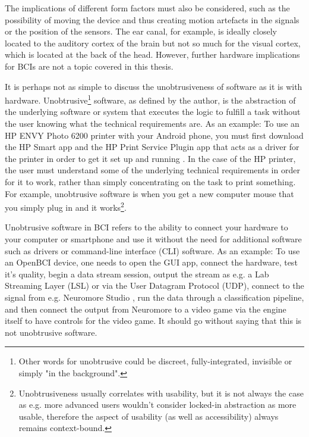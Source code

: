 The implications of different form factors must also be considered, such as the possibility of moving the device and thus creating motion artefacts in the signals or the position of the sensors. The ear canal, for example, is ideally closely located to the auditory cortex of the brain but not so much for the visual cortex, which is located at the back of the head. However, further hardware implications for BCIs are not a topic covered in this thesis.

It is perhaps not as simple to discuss the unobtrusiveness of software as it is with hardware. Unobtrusive\footnote{Other words for unobtrusive could be discreet, fully-integrated, invisible or simply "in the background".} software, as defined by the author, is the abstraction of the underlying software or system that executes the logic to fulfill a task without the user knowing what the technical requirements are. As an example: To use an HP ENVY Photo 6200 printer with your Android phone, you must first download the HP Smart app and the HP Print Service Plugin app that acts as a driver for the printer in order to get it set up and running \citep{hp_hp_nodate}. In the case of the HP printer, the user must understand some of the underlying technical requirements in order for it to work, rather than simply concentrating on the task to print something. For example, unobtrusive software is when you get a new computer mouse that you simply plug in and it works\footnote{Unobtrusiveness usually correlates with usability, but it is not always the case as e.g. more advanced users wouldn't consider locked-in abstraction as more usable, therefore the aspect of usability (as well as accessibility) always remains context-bound.}.

Unobtrusive software in BCI refers to the ability to connect your hardware to your computer or smartphone and use it without the need for additional software such as drivers or command-line interface (CLI) software. As an example: To use an OpenBCI device, one needs to open the GUI app, connect the hardware, test it's quality, begin a data stream session, output the stream as e.g. a Lab Streaming Layer (LSL) or via the User Datagram Protocol (UDP), connect to the signal from e.g. Neuromore Studio \citep{openbci_neuromore_nodate}, run the data through a classification pipeline, and then connect the output from Neuromore to a video game via the engine itself to have controls for the video game. It should go without saying that this is not unobtrusive software.

